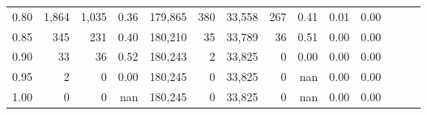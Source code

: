 \begin{tabular}{rrrrrrrrrrrrrr}
0.80 &   1,864 &  1,035 &  0.36 &  179,865 &      380 &  33,558 &     267 &  0.41 &  0.01 &      0.00 \\
0.85 &     345 &    231 &  0.40 &  180,210 &       35 &  33,789 &      36 &  0.51 &  0.00 &      0.00 \\
0.90 &      33 &     36 &  0.52 &  180,243 &        2 &  33,825 &       0 &  0.00 &  0.00 &      0.00 \\
0.95 &       2 &      0 &  0.00 &  180,245 &        0 &  33,825 &       0 &   nan &  0.00 &      0.00 \\
1.00 &       0 &      0 &   nan &  180,245 &        0 &  33,825 &       0 &   nan &  0.00 &      0.00 \\
\bottomrule
\end{tabular}
